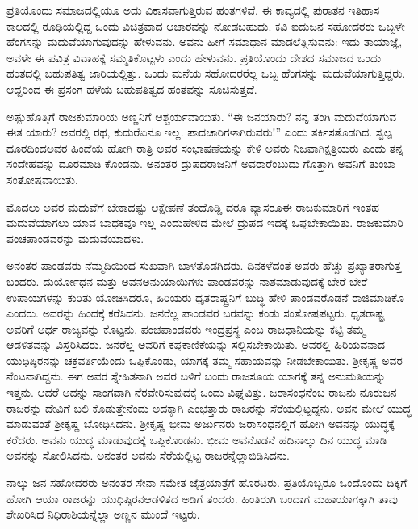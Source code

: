ಪ್ರತಿಯೊಂದು ಸಮಾಜದಲ್ಲಿಯೂ ಅದು ವಿಕಾಸವಾಗುತ್ತಿರುವ ಹಂತಗಳಿವೆ. ಈ ಕಾವ್ಯದಲ್ಲಿ ಪುರಾತನ ಇತಿಹಾಸ ಕಾಲದಲ್ಲಿ ರೂಢಿಯಲ್ಲಿದ್ದ ಒಂದು ವಿಚಿತ್ರವಾದ ಆಚಾರವನ್ನು ನೋಡಬಹುದು. ಕವಿ ಐದುಜನ ಸಹೋದರರು ಒಬ್ಬಳೇ ಹೆಂಗಸನ್ನು ಮದುವೆಯಾಗುವುದನ್ನು ಹೇಳುವನು. ಅವನು ಹೀಗೆ ಸಮಾಧಾನ ಮಾಡಲೆತ್ನಿಸುವನು: ಇದು ತಾಯಾಜ್ಞೆ, ಅವಳೇ ಈ ಪವಿತ್ರ ವಿವಾಹಕ್ಕೆ ಸಮ್ಮತಿಕೊಟ್ಟಳು ಎಂದು ಹೇಳುವನು. ಪ್ರತಿಯೊಂದು ದೇಶದ ಸಮಾಜದ ಒಂದು ಹಂತದಲ್ಲಿ ಬಹುಪತಿತ್ವ ಜಾರಿಯಲ್ಲಿತ್ತು. ಒಂದು ಮನೆಯ ಸಹೋದರರೆಲ್ಲ ಒಬ್ಬ ಹೆಂಗಸನ್ನು ಮದುವೆಯಾಗುತ್ತಿದ್ದರು. ಆದ್ದರಿಂದ ಈ ಪ್ರಸಂಗ ಹಳೆಯ ಬಹುಪತಿತ್ವದ ಹಂತವನ್ನು ಸೂಚಿಸುತ್ತದೆ.

ಅಷ್ಟುಹೊತ್ತಿಗೆ ರಾಜಕುಮಾರಿಯ ಅಣ್ಣನಿಗೆ ಆಶ್ಚರ್ಯವಾಯಿತು. “ಈ ಜನ\break ಯಾರು? ನನ್ನ ತಂಗಿ ಮದುವೆಯಾಗುವ ಈತ ಯಾರು? ಅವರಲ್ಲಿ ರಥ, ಕುದುರೆ\break ಏನೂ ಇಲ್ಲ. ಪಾದಚಾರಿಗಳಾಗಿರುವರು!” ಎಂದು ತರ್ಕಿಸತೊಡಗಿದ. ಸ್ವಲ್ಪ ದೂರದಿಂದ\break ಅವರ ಹಿಂದೆಯೆ ಹೋಗಿ ರಾತ್ರಿ ಅವರ ಸಂಭಾಷಣೆಯನ್ನು ಕೇಳಿ ಅವರು ನಿಜವಾಗಿ\break ಕ್ಷತ್ರಿಯರು ಎಂದು ತನ್ನ ಸಂದೇಹವನ್ನು ದೂರಮಾಡಿ ಕೊಂಡನು. ಅನಂತರ ದ್ರುಪದ\-ರಾಜನಿಗೆ ಅವರಾರೆಂಬುದು ಗೊತ್ತಾಗಿ ಅವನಿಗೆ ತುಂಬಾ ಸಂತೋಷವಾಯಿತು.

ಮೊದಲು ಅವರ ಮದುವೆಗೆ ಬೇಕಾದಷ್ಟು ಆಕ್ಷೇಪಣೆ ತಂದೊಡ್ಡಿ ದರೂ ವ್ಯಾಸರೂ\break ಈ ರಾಜಕುಮಾರಿಗೆ ಇಂತಹ ಮದುವೆಯಾಗಲು ಯಾವ ಬಾಧಕವೂ ಇಲ್ಲ ಎಂದು\break ಹೇಳಿದ ಮೇಲೆ ದ್ರುಪದ ಇದಕ್ಕೆ ಒಪ್ಪಬೇಕಾಯಿತು. ರಾಜಕುಮಾರಿ ಪಂಚಪಾಂಡವರನ್ನು ಮದುವೆಯಾದಳು.

ಅನಂತರ ಪಾಂಡವರು ನೆಮ್ಮದಿಯಿಂದ ಸುಖವಾಗಿ ಬಾಳತೊಡಗಿದರು. ದಿನಕಳೆದಂತೆ ಅವರು ಹೆಚ್ಚು ಪ್ರಖ್ಯಾತರಾಗುತ್ತ ಬಂದರು. ದುರ್ಯೋಧನ ಮತ್ತು ಅವನ\break ಅನುಯಾಯಿಗಳು ಪಾಂಡವರನ್ನು ನಾಶಮಾಡುವುದಕ್ಕೆ ಬೇರೆ ಬೇರೆ ಉಪಾಯಗಳನ್ನು ಕುರಿತು ಯೋಚಿಸಿದರೂ, ಹಿರಿಯರು ಧೃತರಾಷ್ಟ್ರನಿಗೆ ಬುದ್ಧಿ ಹೇಳಿ ಪಾಂಡವರೊಡನೆ ರಾಜಿಮಾಡಿಕೊ ಎಂದರು. ಅವರನ್ನು ಹಿಂದಕ್ಕೆ ಕರೆಸಿದನು. ಜನರೆಲ್ಲ ಪಾಂಡವರ ಬರವನ್ನು ಕಂಡು ಸಂತೋಷಪಟ್ಟರು. ಧೃತರಾಷ್ಟ್ರ ಅವರಿಗೆ ಅರ್ಧ ರಾಜ್ಯವನ್ನು ಕೊಟ್ಟನು. ಪಂಚಪಾಂಡವರು ಇಂದ್ರಪ್ರಸ್ಥ ಎಂಬ ರಾಜಧಾನಿಯನ್ನು ಕಟ್ಟಿ ತಮ್ಮ ಆಡಳಿತವನ್ನು ವಿಸ್ತರಿಸಿದರು. ಜನರೆಲ್ಲ ಅವರಿಗೆ ಕಪ್ಪಕಾಣಿಕೆಯನ್ನು ಸಲ್ಲಿಸಬೇಕಾಯಿತು. ಅವರಲ್ಲಿ ಹಿರಿಯವನಾದ ಯುಧಿಷ್ಠಿರನನ್ನು ಚಕ್ರವರ್ತಿಯೆಂದು ಒಪ್ಪಿಕೊಂಡು, ಯಾಗಕ್ಕೆ ತಮ್ಮ ಸಹಾಯವನ್ನು ನೀಡಬೇಕಾಯಿತು. ಶ‍್ರೀಕೃಷ್ಣ ಅವರ ನೆಂಟನಾಗಿದ್ದನು. ಈಗ ಅವರ ಸ್ನೇಹಿತನಾಗಿ ಅವರ ಬಳಿಗೆ ಬಂದು ರಾಜಸೂಯ ಯಾಗಕ್ಕೆ ತನ್ನ ಅನುಮತಿಯನ್ನು ಇತ್ತನು. ಆದರೆ ಅದನ್ನು ಸಾಂಗವಾಗಿ ನೆರವೇರಿಸುವುದಕ್ಕೆ ಒಂದು ವಿಘ್ನವಿತ್ತು. ಜರಾಸಂಧನೆಂಬ ರಾಜನು ನೂರುಜನ ರಾಜರನ್ನು ದೇವಿಗೆ ಬಲಿ ಕೊಡುತ್ತೇನೆಂದು ಅದಕ್ಕಾಗಿ ಎಂಭತ್ತಾರು ರಾಜರನ್ನು ಸೆರೆಯಲ್ಲಿಟ್ಟದ್ದನು. ಅವನ ಮೇಲೆ ಯುದ್ಧ ಮಾಡುವಂತೆ ಶ‍್ರೀಕೃಷ್ಣ ಬೋಧಿಸಿದನು. ಶ‍್ರೀಕೃಷ್ಣ ಭೀಮ ಅರ್ಜುನರು ಜರಾಸಂಧನಲ್ಲಿಗೆ ಹೋಗಿ ಅವನನ್ನು ಯುದ್ಧಕ್ಕೆ ಕರೆದರು. ಅವನು ಯುದ್ಧ ಮಾಡುವುದಕ್ಕೆ ಒಪ್ಪಿಕೊಂಡನು. ಭೀಮ ಅವನೊಡನೆ ಹದಿನಾಲ್ಕು ದಿನ ಯುದ್ಧ ಮಾಡಿ ಅವನನ್ನು ಸೋಲಿಸಿದನು. ಅನಂತರ ಅವನು ಸೆರೆಯಲ್ಲಿಟ್ಟ ರಾಜರನ್ನೆಲ್ಲಾ\break ಬಿಡಿಸಿದನು.

ನಾಲ್ಕು ಜನ ಸಹೋದರರು ಅನಂತರ ಸೇನಾ ಸಮೇತ ಜೈತ್ರಯಾತ್ರೆಗೆ ಹೊರಟರು. ಪ್ರತಿಯೊಬ್ಬರೂ ಒಂದೊಂದು ದಿಕ್ಕಿಗೆ ಹೋಗಿ ಆಯಾ ರಾಜರನ್ನು ಯುಧಿಷ್ಠಿರನ\break ಆಡಳಿತದ ಅಡಿಗೆ ತಂದರು. ಹಿಂತಿರುಗಿ ಬಂದಾಗ ಮಹಾಯಾಗಕ್ಕಾಗಿ ತಾವು ಶೇಖರಿಸಿದ ನಿಧಿರಾಶಿಯನ್ನೆಲ್ಲಾ ಅಣ್ಣನ ಮುಂದೆ ಇಟ್ಟರು.

\vskip 0.1cm

